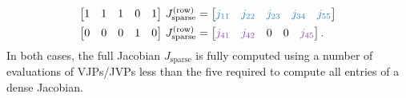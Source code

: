 \begin{align}
\begin{split}
    \begin{bmatrix}
    1 & 1 & 1 & 0 & 1    
    \end{bmatrix}
    \,
    J^{(\text{row})}_{\text{sparse}} 
    &= 
    \begin{bmatrix}
    \color{myblue}{j_{11}} & \color{myblue}{j_{22}} & \color{myblue}{j_{23}} & \color{myblue}{j_{34}} &    \color{myblue}{j_{55}}
    \end{bmatrix} \\
    \begin{bmatrix}
    0 & 0 & 0 & 1 & 0    
    \end{bmatrix}
    \,
    J^{(\text{row})}_{\text{sparse}} 
    &= 
    \begin{bmatrix}
    \color{myviolet}{j_{41}} & \color{myviolet}{j_{42}} & 0 & 0 & \color{myviolet}{j_{45}}
    \end{bmatrix}.\\
\end{split}
\end{align}
In both cases, the full Jacobian ${J}_{\text{sparse}}$ is fully computed using a number of evaluations of VJPs/JVPs less than the five required to compute all entries of a dense Jacobian. 
